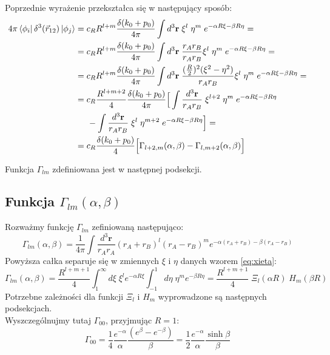 \documentclass[a4paper,12pt]{article}
\numberwithin{equation}{section}
\numberwithin{table}{section}
\numberwithin{figure}{section}
\begin{document}
Poprzednie wyrażenie przekształca się w następujący sposób:
\begin{equation}
\begin{split}
4\pi\bra{\phi_i}\delta^3(\vec{r}_{12})\ket{\phi_j} & = c_R R^{l+m} \frac {\delta(k_{0}+p_{0})}{4\pi}\int d^3 \mathbf{r}\;  \xi^{l}\;\eta^{m}   \; e^{-\alpha R \xi-\beta R \eta} =\\ 
	&=c_R R^{l+m} \frac {\delta(k_{0}+p_{0})}{4\pi}\int d^3 \mathbf{r}\; \frac{r_A r_B}{r_A r_B} \xi^{l}\;\eta^{m}   \; e^{-\alpha R \xi-\beta R \eta} =\\  
	&=c_R R^{l+m} \frac {\delta(k_{0}+p_{0})}{4\pi}\int d^3 \mathbf{r}\; \frac{(\frac{R}{2})^2 (\xi^2 - \eta^2)}{r_A r_B} \xi^{l}\;\eta^{m}   \; e^{-\alpha R \xi-\beta R \eta} =\\  
	&= c_R \frac{R^{l+m+2}}{4} \frac {\delta(k_{0}+p_{0})}{4\pi}\Big[ \int \frac{d^3 \mathbf{r}}{r_A r_B}\; \xi^{l+2}\;\eta^{m}   \; e^{-\alpha R \xi-\beta R \eta} \\
	&\hspace{0.5cm} - \int \frac{d^3 \mathbf{r}}{r_A r_B}\; \xi^{l}\;\eta^{m+2}   \; e^{-\alpha R \xi-\beta R \eta} \Big]=\\
	&= c_R\frac {\delta(k_{0}+p_{0})}{4}\Big[\Gamma_{l+2,m}(\alpha,\beta) - \Gamma_{l,m+2}(\alpha,\beta)\Big]
\end{split}
\end{equation}

Funkcja $\Gamma_{lm}$ zdefiniowana jest w następnej podsekcji.
\subsection{Funkcja $\Gamma_{lm}(\alpha,\beta)$}
Rozważmy funkcję $\Gamma_{lm}$ zefiniowaną następująco:
\begin{equation} \label{eq:gamma}
\Gamma_{lm}(\alpha,\beta)=\frac{1}{4\pi} \int \frac{d^{3}\mathbf{r}}{r_A r_A} (r_A+r_B)^l (r_A-r_B)^m e^{-\alpha (r_A+r_B) - \beta (r_A-r_B)}
\end{equation}
Powyższa całka separuje się w zmiennych $\xi$ i $\eta$ danych wzorem \eqref{eq:xieta}:
\begin{equation}
	\Gamma_{lm}(\alpha,\beta)=\frac{R^{l+m+1}}{4} \int_1^\infty d\xi \; \xi^l e^{-\alpha R  \xi}\int_{-1}^1 d\eta \; \eta^m e^{-\beta R \eta}=\frac{R^{l+m+1}}{4} \; \Xi_l(\alpha R) \; H_m(\beta R)
\end{equation}
Potrzebne zależności dla funkcji $\Xi_l$ i $H_m$ wyprowadzone są następnych podsekcjach.\\
Wyszczególnujmy tutaj $\Gamma_{00}$, przyjmując $R = 1$:
\begin{equation}
	\Gamma_{00}=\frac{1}{4} \frac{e^{-\alpha}}{\alpha}\frac{(e^\beta-e^{-\beta})}{\beta}=\frac{1}{2}\frac{e^{-\alpha}}{\alpha}\frac{\sinh\beta}{\beta}
\end{equation}
\end{document}
